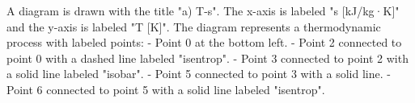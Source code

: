 A diagram is drawn with the title "a) T-s". The x-axis is labeled "s [kJ/kg·K]" and the y-axis is labeled "T [K]". The diagram represents a thermodynamic process with labeled points:  
- Point 0 at the bottom left.  
- Point 2 connected to point 0 with a dashed line labeled "isentrop".  
- Point 3 connected to point 2 with a solid line labeled "isobar".  
- Point 5 connected to point 3 with a solid line.  
- Point 6 connected to point 5 with a solid line labeled "isentrop".
